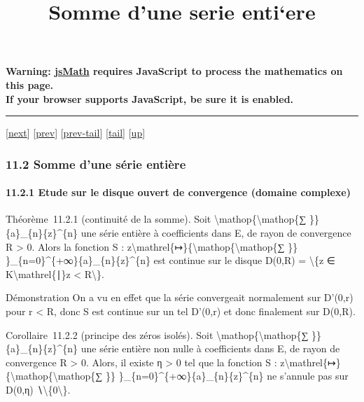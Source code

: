 \documentclass[]{article}
\title{Somme d'une serie enti`ere}
\author{}
\date{}
\begin{document}
\maketitle

\textbf{Warning: \href{http://www.math.union.edu/locate/jsMath}{jsMath}
requires JavaScript to process the mathematics on this page.\\ If your
browser supports JavaScript, be sure it is enabled.}

\begin{center}\rule{3in}{0.4pt}\end{center}

{[}\href{coursse65.html}{next}{]} {[}\href{coursse63.html}{prev}{]}
{[}\href{coursse63.html\#tailcoursse63.html}{prev-tail}{]}
{[}\hyperref[tailcoursse64.html]{tail}{]}
{[}\href{coursch12.html\#coursse64.html}{up}{]}

\subsubsection{11.2 Somme d'une série entière}

\paragraph{11.2.1 Etude sur le disque ouvert de convergence (domaine
complexe)}

Théorème~11.2.1 (continuité de la somme). Soit
\textbackslash{}mathop\{\textbackslash{}mathop\{∑ \}\}
\{a\}\_\{n\}\{z\}\^{}\{n\} une série entière à coefficients dans E, de
rayon de convergence R \textgreater{} 0. Alors la fonction S :
z\textbackslash{}mathrel\{↦\}\{\textbackslash{}mathop\{\textbackslash{}mathop\{∑
\}\} \}\_\{n=0\}\^{}\{+∞\}\{a\}\_\{n\}\{z\}\^{}\{n\} est continue sur le
disque D(0,R) = \textbackslash{}\{z ∈
K\textbackslash{}mathrel\{∣\}\textbar{}z\textbar{} \textless{}
R\textbackslash{}\}.

Démonstration On a vu en effet que la série convergeait normalement sur
D'(0,r) pour r \textless{} R, donc S est continue sur un tel D'(0,r) et
donc finalement sur D(0,R).

Corollaire~11.2.2 (principe des zéros isolés). Soit
\textbackslash{}mathop\{\textbackslash{}mathop\{∑ \}\}
\{a\}\_\{n\}\{z\}\^{}\{n\} une série entière non nulle à coefficients
dans E, de rayon de convergence R \textgreater{} 0. Alors, il existe η
\textgreater{} 0 tel que la fonction S :
z\textbackslash{}mathrel\{↦\}\{\textbackslash{}mathop\{\textbackslash{}mathop\{∑
\}\} \}\_\{n=0\}\^{}\{+∞\}\{a\}\_\{n\}\{z\}\^{}\{n\} ne s'annule pas sur
D(0,η) ∖\textbackslash{}\{0\textbackslash{}\}.
\end{document}
